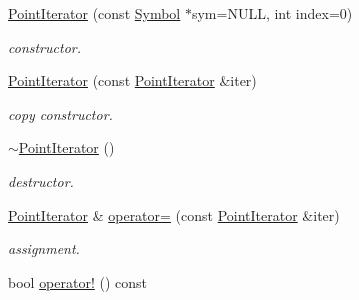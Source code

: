 \begin{DoxyCompactItemize}
\item 
\hypertarget{classzbar_1_1_symbol_1_1_point_iterator_a4ddf7c5e2b49cf3d93fd481c25878972}{
\hyperlink{classzbar_1_1_symbol_1_1_point_iterator_a4ddf7c5e2b49cf3d93fd481c25878972}{PointIterator} (const \hyperlink{classzbar_1_1_symbol}{Symbol} $\ast$sym=NULL, int index=0)}
\label{classzbar_1_1_symbol_1_1_point_iterator_a4ddf7c5e2b49cf3d93fd481c25878972}

\begin{DoxyCompactList}\small\item\em constructor. \end{DoxyCompactList}\item 
\hypertarget{classzbar_1_1_symbol_1_1_point_iterator_a3f8c316a2c0ae0c1199625f2f1d7b1e3}{
\hyperlink{classzbar_1_1_symbol_1_1_point_iterator_a3f8c316a2c0ae0c1199625f2f1d7b1e3}{PointIterator} (const \hyperlink{classzbar_1_1_symbol_1_1_point_iterator}{PointIterator} \&iter)}
\label{classzbar_1_1_symbol_1_1_point_iterator_a3f8c316a2c0ae0c1199625f2f1d7b1e3}

\begin{DoxyCompactList}\small\item\em copy constructor. \end{DoxyCompactList}\item 
\hypertarget{classzbar_1_1_symbol_1_1_point_iterator_a0878409c199a487ac42147bf52fead04}{
\hyperlink{classzbar_1_1_symbol_1_1_point_iterator_a0878409c199a487ac42147bf52fead04}{$\sim$PointIterator} ()}
\label{classzbar_1_1_symbol_1_1_point_iterator_a0878409c199a487ac42147bf52fead04}

\begin{DoxyCompactList}\small\item\em destructor. \end{DoxyCompactList}\item 
\hypertarget{classzbar_1_1_symbol_1_1_point_iterator_a2f05d4ab099ff5920765bc9cf32adc23}{
\hyperlink{classzbar_1_1_symbol_1_1_point_iterator}{PointIterator} \& \hyperlink{classzbar_1_1_symbol_1_1_point_iterator_a2f05d4ab099ff5920765bc9cf32adc23}{operator=} (const \hyperlink{classzbar_1_1_symbol_1_1_point_iterator}{PointIterator} \&iter)}
\label{classzbar_1_1_symbol_1_1_point_iterator_a2f05d4ab099ff5920765bc9cf32adc23}

\begin{DoxyCompactList}\small\item\em assignment. \end{DoxyCompactList}\item 
\hypertarget{classzbar_1_1_symbol_1_1_point_iterator_ae5b14abb58026688996ab333f53855ac}{
bool \hyperlink{classzbar_1_1_symbol_1_1_point_iterator_ae5b14abb58026688996ab333f53855ac}{operator!} () const }
\label{classzbar_1_1_symbol_1_1_point_iterator_ae5b14abb58026688996ab333f53855ac}


\end{DoxyCompactItemize}
